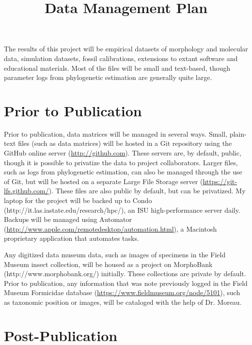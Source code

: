 \documentclass[12pt,letterpaper,indentfirst]{article}
\begin{document}
\title{Data Management Plan}
\maketitle

The results of this project will be empirical datasets of morphology and molecular data, simulation datasets, fossil calibrations, extensions to extant software and educational materials. Most of the files will be small and text-based, though parameter logs from phylogenetic estimation are generally quite large. 

\section{Prior to Publication}

Prior to publication, data matrices will be managed in several ways. Small, plain-text files (such as data matrices) will be hosted in a Git repository using the GitHub online server (\url{http://github.com}). These servers are, by default, public, though it is possible to privatize the data to project collaborators.  Larger files, such as logs from phylogenetic estimation, can also be managed through the use of Git, but will be hosted on a separate Large File Storage server (\url{https://git-lfs.github.com/}). These files are also public by default, but can be privatized. My laptop for the project will be backed up to Condo (http://it.las.iastate.edu/research/hpc/), an ISU high-performance server daily. Backups will be managed using Automator (\url{http://www.apple.com/remotedesktop/automation.html}), a Macintosh proprietary application that automates tasks.\par
Any digitized data museum data, such as images of specimens in the Field Museum insect collection, will be housed as a project on MorphoBank (http://www.morphobank.org/) initially. These collections are private by default. Prior to publication, any information that was note previously logged in the Field Museum Formicidae database \linebreak (\url{https://www.fieldmuseum.org/node/5101}), such as taxonomic position or images, will be cataloged with the help of Dr. Moreau.  \par

\section{Post-Publication}
\end{document}
